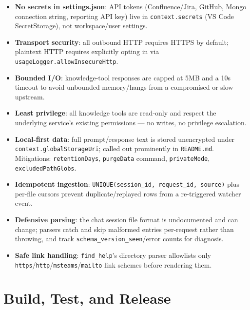 \documentclass[11pt,a4paper]{article}
\newcommand{\code}[1]{\texttt{\color{lloydsblue!80!black}#1}}
\begin{document}
\begin{itemize}[leftmargin=1.4em]
  \item \textbf{No secrets in settings.json}: API tokens (Confluence/Jira, GitHub, Mongo connection string, reporting API key) live in \code{context.secrets} (VS Code SecretStorage), not workspace/user settings.
  \item \textbf{Transport security}: all outbound HTTP requires HTTPS by default; plaintext HTTP requires explicitly opting in via \code{usageLogger.allowInsecureHttp}.
  \item \textbf{Bounded I/O}: knowledge-tool responses are capped at 5MB and a 10s timeout to avoid unbounded memory/hangs from a compromised or slow upstream.
  \item \textbf{Least privilege}: all knowledge tools are read-only and respect the underlying service's existing permissions --- no writes, no privilege escalation.
  \item \textbf{Local-first data}: full prompt/response text is stored unencrypted under \code{context.globalStorageUri}; called out prominently in \code{README.md}. Mitigations: \code{retentionDays}, \code{purgeData} command, \code{privateMode}, \code{excludedPathGlobs}.
  \item \textbf{Idempotent ingestion}: \code{UNIQUE(session\_id, request\_id, source)} plus per-file cursors prevent duplicate/replayed rows from a re-triggered watcher event.
  \item \textbf{Defensive parsing}: the chat session file format is undocumented and can change; parsers catch and skip malformed entries per-request rather than throwing, and track \code{schema\_version\_seen}/error counts for diagnosis.
  \item \textbf{Safe link handling}: \code{find\_help}'s directory parser allowlists only \code{https}/\code{http}/\code{msteams}/\code{mailto} link schemes before rendering them.
\end{itemize}

\section{Build, Test, and Release}
\end{document}
